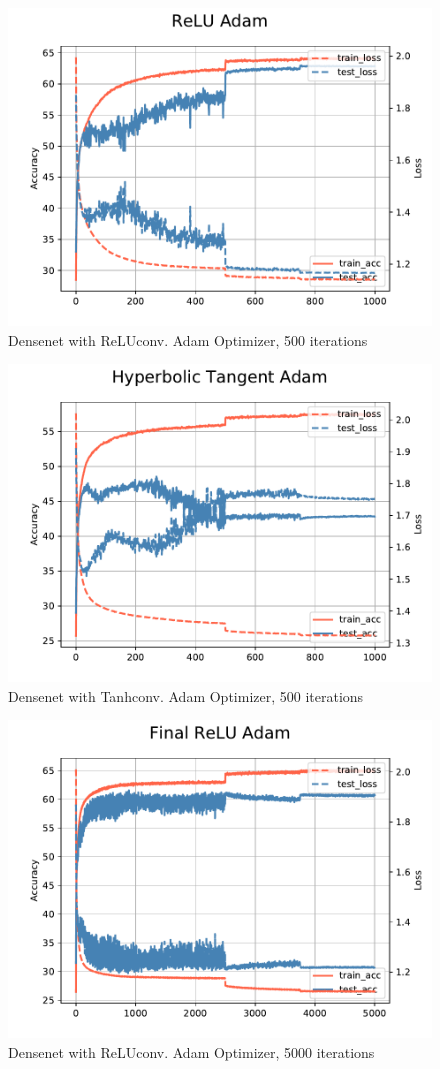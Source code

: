 \documentclass{article}
\begin{document}
\begin{figure}
        \centering
        \includegraphics[width=0.8\linewidth]{figures/Adam500/relu.pdf}
        \caption{Densenet with ReLUconv. Adam Optimizer, 500 iterations}
\end{figure}

\begin{figure}
        \centering
        \includegraphics[width=0.8\linewidth]{figures/Adam500/tanh.pdf}
        \caption{Densenet with Tanhconv. Adam Optimizer, 500 iterations}
\end{figure}

\begin{figure}
        \centering
        \includegraphics[width=0.8\linewidth]{figures/RELU5kcifar10.pdf}
        \caption{Densenet with ReLUconv. Adam Optimizer, 5000 iterations}
\end{figure}
\end{document}
